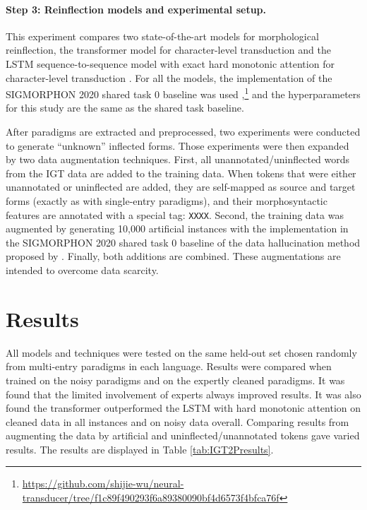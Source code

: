 \paragraph{Step 3: Reinflection models and experimental setup.}
This experiment compares two state-of-the-art models for morphological reinflection, the transformer model for character-level transduction \citep{wu2020applying} and the LSTM sequence-to-sequence model with exact hard monotonic attention for character-level transduction \citep{wu-cotterell-2019-exact}. For all the models, the implementation of the SIGMORPHON 2020 shared task 0 baseline was used \citep{vylomova2020sigmorphon},\footnote{\url{https://github.com/shijie-wu/neural-transducer/tree/f1c89f490293f6a89380090bf4d6573f4bfca76f}} and the hyperparameters for this study are the same as the shared task baseline.

After paradigms are extracted and preprocessed, two experiments were conducted to generate ``unknown'' inflected forms. Those experiments were then expanded by two data augmentation techniques. First, all unannotated/uninflected words from the IGT data are added to the training data. When tokens that were either unannotated or uninflected are added, they are self-mapped as source and target forms (exactly as with single-entry paradigms), and their morphosyntactic features are annotated with a special tag: \texttt{XXXX}.  Second, the training data was augmented by generating 10,000 artificial instances with the implementation in the SIGMORPHON 2020 shared task 0 baseline of the data hallucination method proposed by \citep{anastasopoulos-neubig-2019-pushing}. Finally, both additions are combined. These augmentations are intended to overcome data scarcity. 


\section{Results}
\label{sec:IGT2Presults}

All models and techniques were tested on the same held-out set chosen randomly from multi-entry paradigms in each language. Results were compared when trained on the noisy paradigms and on the expertly cleaned paradigms. It was found that the limited involvement of experts always improved results. It was also found the transformer outperformed the LSTM with hard monotonic attention on cleaned data in all instances and on noisy data overall. Comparing results from augmenting the data by artificial and uninflected/unannotated tokens gave varied results. 
The results are displayed in Table \ref{tab:IGT2Presults}. 

